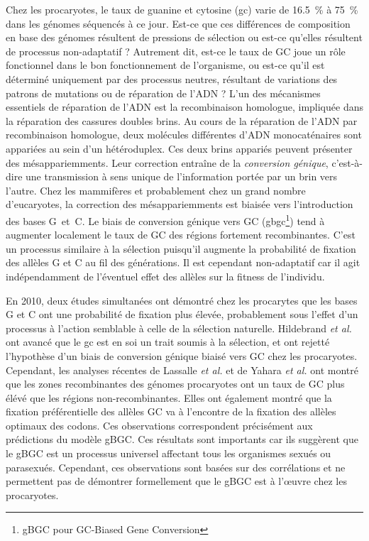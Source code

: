 Chez les procaryotes, le taux de guanine et cytosine (\ac{gc}) varie de
\SI{16.5}{\percent} à \SI{75}{\percent} dans les génomes séquencés à ce jour.
Est-ce que ces différences de composition en base des génomes résultent de
pressions de sélection ou est-ce qu'elles résultent de processus non-adaptatif ?
Autrement dit, est-ce le taux de GC joue un rôle fonctionnel dans le bon
fonctionnement de l'organisme, ou est-ce qu'il est déterminé uniquement par des
processus neutres, résultant de variations des patrons de mutations ou de
réparation de l'ADN ? L'un des mécanismes essentiels de réparation de l'ADN est
la recombinaison homologue, impliquée dans la réparation des cassures doubles
brins. Au cours de la réparation de l'ADN par recombinaison homologue, deux
molécules différentes d'ADN monocaténaires sont appariées au sein d'un
hétéroduplex. Ces deux brins appariés peuvent présenter des mésappariemments.
Leur correction entraîne de la \emph{conversion génique}\cite{chen_gene_2007},
c'est-à-dire une transmission à sens unique de l'information portée par un brin
vers l'autre. Chez les mammifères et probablement chez un grand nombre
d'eucaryotes, la correction des mésappariemments est biaisée vers l'introduction
des bases G~et~C\cite{pessia_evidence_2012}. Le biais de conversion génique vers
GC (\ac{gbgc}\footnote{gBGC pour GC-Biased Gene Conversion}) tend à augmenter
localement le taux de GC des régions fortement
recombinantes\cite{duret_biased_2009,lesecque_gc-biased_2013,williams_non-crossover_2015}.
C'est un processus similaire à la sélection puisqu'il augmente la probabilité de
fixation des allèles G et C au fil des générations. Il est cependant
non-adaptatif car il agit indépendamment de l'éventuel effet des allèles sur la
fitness de l'individu.

En 2010, deux études simultanées\cite{hildebrand_evidence_2010,
  hershberg_evidence_2010} ont démontré chez les procarytes que les bases G et C
ont une probabilité de fixation plus élevée, probablement sous l'effet d'un
processus à l'action semblable à celle de la sélection naturelle. Hildebrand
\emph{et al.} ont avancé que le \ac{gc} est en soi un trait soumis à la
sélection, et ont rejetté l'hypothèse d'un biais de conversion génique biaisé
vers GC chez les procaryotes. Cependant, les analyses récentes de Lassalle
\emph{et al.} \cite{lassalle_gc-content_2015} et de Yahara \emph{et
  al.}\cite{yahara_landscape_2016} ont montré que les zones recombinantes des
génomes procaryotes ont un taux de GC plus élévé que les régions
non-recombinantes. Elles ont également montré que la fixation préférentielle des
allèles GC va à l'encontre de la fixation des allèles optimaux des codons. Ces
observations correspondent précisément aux prédictions du modèle gBGC. Ces
résultats sont importants car ils suggèrent que le gBGC est un processus
universel affectant tous les organismes sexués ou parasexués. Cependant, ces
observations sont basées sur des corrélations et ne permettent pas de démontrer
formellement que le gBGC est à l'œuvre chez les procaryotes.

